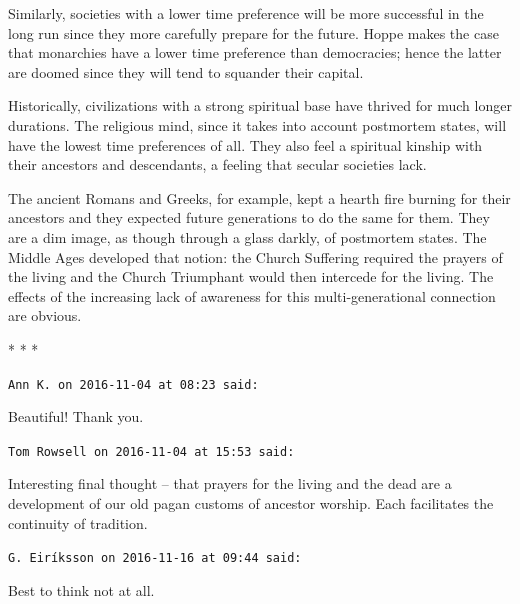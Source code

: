 Similarly, societies with a lower time preference will be more successful in the long run since they more carefully prepare for the future. Hoppe makes the case that monarchies have a lower time preference than democracies; hence the latter are doomed since they will tend to squander their capital.

Historically, civilizations with a strong spiritual base have thrived for much longer durations. The religious mind, since it takes into account postmortem states, will have the lowest time preferences of all. They also feel a spiritual kinship with their ancestors and descendants, a feeling that secular societies lack.

The ancient Romans and Greeks, for example, kept a hearth fire burning for their ancestors and they expected future generations to do the same for them. They are a dim image, as though through a glass darkly, of postmortem states. The Middle Ages developed that notion: the Church Suffering required the prayers of the living and the Church Triumphant would then intercede for the living. The effects of the increasing lack of awareness for this multi-generational connection are obvious.



\begin{center}* * *\end{center}

\begin{footnotesize}
\begin{sffamily}
\texttt{Ann K. on 2016-11-04 at 08:23 said:}

Beautiful! Thank you.

\hfill

\texttt{Tom Rowsell on 2016-11-04 at 15:53 said:}

Interesting final thought -- that prayers for the living and the dead are a development of our old pagan customs of ancestor worship. Each facilitates the continuity of tradition.

\hfill

\texttt{G. Eiríksson on 2016-11-16 at 09:44 said:}

Best to think not at all.


\hfill

\end{sffamily}
\end{footnotesize}

